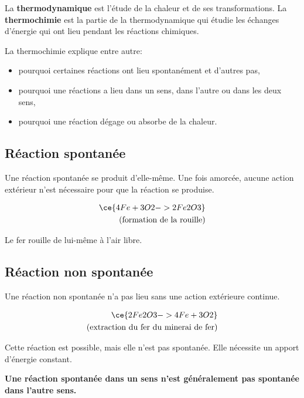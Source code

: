 \documentclass[
  11pt,
  french,
  a4paper,
  openany]{book}
\providecommand{\tightlist}{%
  \setlength{\itemsep}{0pt}\setlength{\parskip}{0pt}}
\begin{document}
La \textbf{thermodynamique} est l'étude de la chaleur et de ses transformations. La \textbf{thermochimie} est la partie de la thermodynamique qui étudie les échanges d'énergie qui ont lieu pendant les réactions chimiques.

La thermochimie explique entre autre:

\begin{itemize}
\tightlist
\item
  pourquoi certaines réactions ont lieu spontanément et d'autres pas,
\item
  pourquoi une réactions a lieu dans un sens, dans l'autre ou dans les deux sens,
\item
  pourquoi une réaction dégage ou absorbe de la chaleur.
\end{itemize}

\hypertarget{ruxe9action-spontanuxe9e}{%
\subsection{Réaction spontanée}\label{ruxe9action-spontanuxe9e}}

Une réaction spontanée se produit d'elle-même. Une fois amorcée, aucune action extérieur n'est nécessaire pour que la réaction se produise.

\[ \begin{split}
  \ce{ 4 Fe + 3O2 -> 2Fe2O3 } \\
  \text{(formation de la rouille)}
  \end{split} \]

Le fer rouille de lui-même à l'air libre.

\hypertarget{ruxe9action-non-spontanuxe9e}{%
\subsection{Réaction non spontanée}\label{ruxe9action-non-spontanuxe9e}}

Une réaction non spontanée n'a pas lieu sans une action extérieure continue.

\[ \begin{split}
  \ce{ 2Fe2O3 -> 4 Fe + 3O2 } \\
  \text{(extraction du fer du minerai de fer)}
  \end{split} \]

Cette réaction est possible, mais elle n'est pas spontanée. Elle nécessite un apport d'énergie constant.

\textbf{Une réaction spontanée dans un sens n'est généralement pas spontanée dans l'autre sens.}
\end{document}
